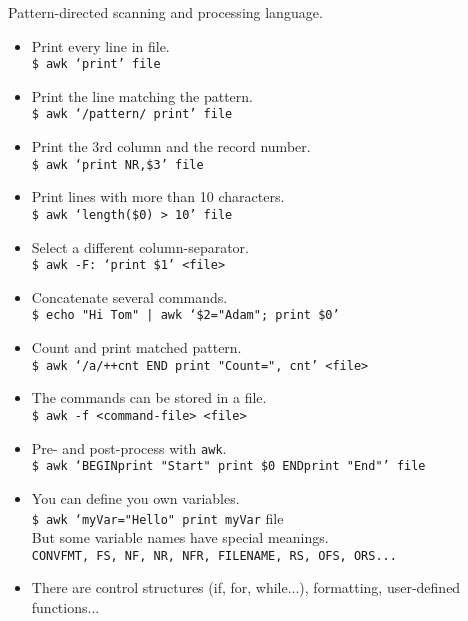Pattern-directed scanning and processing language.

\begin{itemize}[label={-}, leftmargin=*]
\addtolength{\itemsep}{-2pt}
\item Print every line in file.\\
{\tt \$ awk `{print}' file}

\item Print the line matching the pattern.\\
{\tt \$ awk `/pattern/ {print}' file}

\item Print the 3rd column and the record number.\\
{\tt \$ awk `{print NR,\$3}' file}
\item Print lines with more than 10 characters.\\
{\tt \$ awk `length(\$0) > 10' file}

\item Select a different column-separator.\\
{\tt \$ awk -F: `{print \$1}' <file>}

\item Concatenate several commands.\\
{\tt \$ echo "Hi Tom" | awk `{\$2="Adam"; print \$0}'}

\item Count and print matched pattern.\\
{\tt \$ awk `/a/{++cnt} END {print "Count=", cnt}' <file>}

\item The commands can be stored in a file.\\
{\tt \$ awk -f <command-file> <file>}

\item Pre- and post-process with {\tt awk}.\\
{\tt \$ awk `BEGIN{print "Start"} {print \$0} END{print "End"}' file}

\item You can define you own variables.\\
{\tt \$ awk `myVar="Hello" print myVar} file\\
But some variable names have special meanings.\\
{\tt CONVFMT, FS, NF, NR, NFR, FILENAME, RS, OFS, ORS...}

\item There are control structures (if, for, while...), formatting, user-defined functions...\\
\end{itemize}